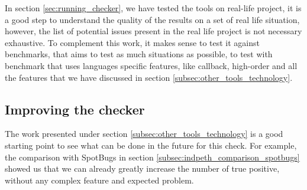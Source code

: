 In section \ref{sec:running_checker}, we have tested the tools on real-life project, it is a good step to understand the quality of the results on a set of real life situation, however, the list of potential issues present in the real life project is not necessary exhaustive. 
To complement this work, it makes sense to test it against benchmarks, that aims to test as much situations as possible, to test with benchmark that uses languages specific features, like callback, high-order and all the features that we have discussed in section \ref{subsec:other_tools_technology}.

\subsection{Improving the checker}
\label{subsec:other_tools}

The work presented under section \ref{subsec:other_tools_technology} is a good starting point to see what can be done in the future for this check. 
For example, the comparison with SpotBugs in section \ref{subsec:indpeth_comparison_spotbugs} showed us that we can already greatly increase the number of true positive, without any complex feature and expected problem.